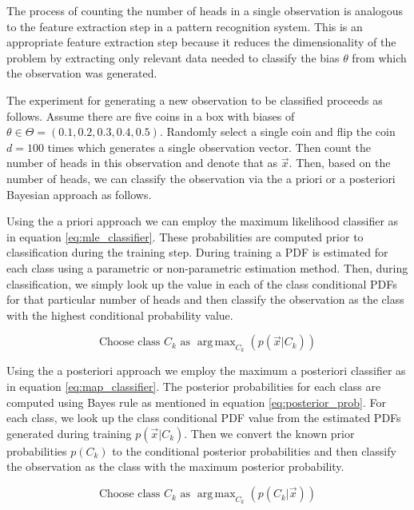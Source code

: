 \documentclass[journal]{IEEEtran}
\DeclareMathOperator*{\argmax}{arg\,max}
\begin{document}
\par The process of counting the number of heads in a single observation is analogous to the feature extraction step in a pattern recognition system. This is an appropriate feature extraction step because it reduces the dimensionality of the problem by extracting only relevant data needed to classify the bias \(\theta\) from which the observation was generated.

\par The experiment for generating a new observation to be classified proceeds as follows. Assume there are five coins in a box with biases of \(\theta \in \Theta = (0.1, 0.2, 0.3, 0.4, 0.5)\). Randomly select a single coin and flip the coin \(d=100\) times which generates a single observation vector. Then count the number of heads in this observation and denote that as \(\vec{x}\). Then, based on the number of heads, we can classify the observation via the a priori or a posteriori Bayesian approach as follows.

\par Using the a priori approach we can employ the maximum likelihood classifier as in equation \ref{eq:mle_classifier}. These probabilities are computed prior to classification during the training step. During training a PDF is estimated for each class using a parametric or non-parametric estimation method. Then, during classification, we simply look up the value in each of the class conditional PDFs for that particular number of heads and then classify the observation as the class with the highest conditional probability value.

\begin{equation}
\label{eq:mle_classifier}
\text{Choose class   } C_k \text{  as  } \argmax_{C_k}(p(\vec{x}\vert C_k))
\end{equation}

\par Using the a posteriori approach we employ the maximum a posteriori classifier as in equation \ref{eq:map_classifier}. The posterior probabilities for each class are computed using Bayes rule as mentioned in equation \ref{eq:posterior_prob}. For each class, we look up the class conditional PDF value from the estimated PDFs generated during training \(p(\vec{x} \vert C_k)\). Then we convert the known prior probabilities \(p(C_k)\) to the conditional posterior probabilities and then classify the observation as the class with the maximum posterior probability.

\begin{equation}
\label{eq:map_classifier}
\text{Choose class   } C_k \text{  as  } \argmax_{C_k}(p(C_k \vert \vec{x}))
\end{equation}
\end{document}
